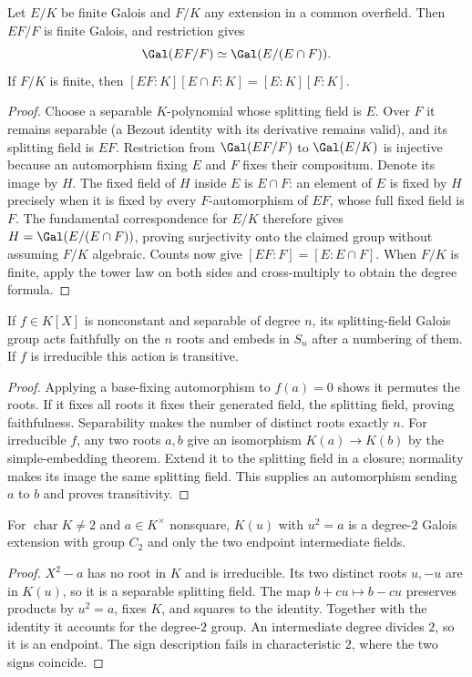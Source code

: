 \begin{theorem}
Let $E/K$ be finite Galois and $F/K$ any extension in a common overfield. Then $EF/F$ is finite Galois, and restriction gives
\[\Gal(EF/F)\simeq\Gal(E/(E\cap F)).\]
If $F/K$ is finite, then $[EF:K][E\cap F:K]=[E:K][F:K]$.
\end{theorem}
\begin{proof}
Choose a separable $K$-polynomial whose splitting field is $E$. Over $F$ it remains separable (a Bezout identity with its derivative remains valid), and its splitting field is $EF$. Restriction from $\Gal(EF/F)$ to $\Gal(E/K)$ is injective because an automorphism fixing $E$ and $F$ fixes their compositum. Denote its image by $H$. The fixed field of $H$ inside $E$ is $E\cap F$: an element of $E$ is fixed by $H$ precisely when it is fixed by every $F$-automorphism of $EF$, whose full fixed field is $F$. The fundamental correspondence for $E/K$ therefore gives $H=\Gal(E/(E\cap F))$, proving surjectivity onto the claimed group without assuming $F/K$ algebraic. Counts now give $[EF:F]=[E:E\cap F]$. When $F/K$ is finite, apply the tower law on both sides and cross-multiply to obtain the degree formula.
\end{proof}

\begin{theorem}
If $f\in K[X]$ is nonconstant and separable of degree $n$, its splitting-field Galois group acts faithfully on the $n$ roots and embeds in $S_n$ after a numbering of them. If $f$ is irreducible this action is transitive.
\end{theorem}
\begin{proof}
Applying a base-fixing automorphism to $f(a)=0$ shows it permutes the roots. If it fixes all roots it fixes their generated field, the splitting field, proving faithfulness. Separability makes the number of distinct roots exactly $n$. For irreducible $f$, any two roots $a,b$ give an isomorphism $K(a)\to K(b)$ by the simple-embedding theorem. Extend it to the splitting field in a closure; normality makes its image the same splitting field. This supplies an automorphism sending $a$ to $b$ and proves transitivity.
\end{proof}

\begin{example}
For $\operatorname{char}K\ne2$ and $a\in K^\times$ nonsquare, $K(u)$ with $u^2=a$ is a degree-$2$ Galois extension with group $C_2$ and only the two endpoint intermediate fields.
\end{example}
\begin{proof}
$X^2-a$ has no root in $K$ and is irreducible. Its two distinct roots $u,-u$ are in $K(u)$, so it is a separable splitting field. The map $b+cu\mapsto b-cu$ preserves products by $u^2=a$, fixes $K$, and squares to the identity. Together with the identity it accounts for the degree-$2$ group. An intermediate degree divides $2$, so it is an endpoint. The sign description fails in characteristic $2$, where the two signs coincide.
\end{proof}

